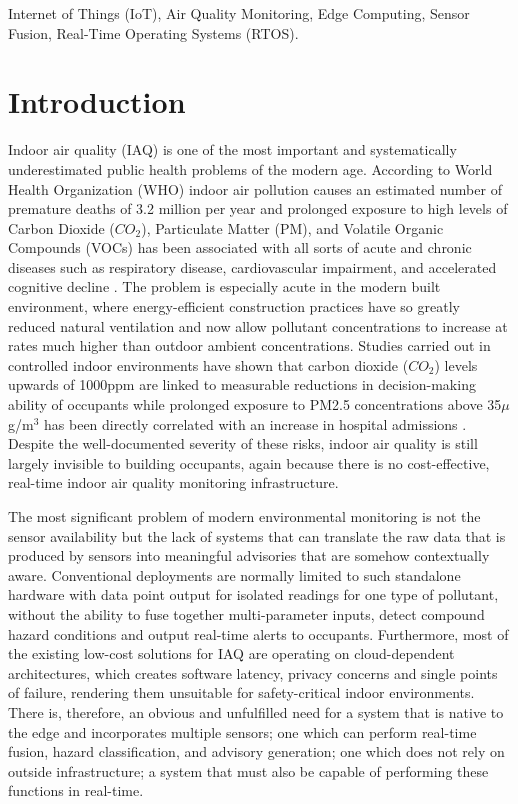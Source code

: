 \documentclass[conference]{IEEEtran}
\begin{document}
\begin{IEEEkeywords}
Internet of Things (IoT), Air Quality Monitoring, Edge Computing, Sensor Fusion, Real-Time Operating Systems (RTOS).
\end{IEEEkeywords}

\section{Introduction}
Indoor air quality (IAQ) is one of the most important and systematically underestimated public health problems of the modern age. According to World Health Organization (WHO) indoor air pollution causes an estimated number of premature deaths of 3.2 million per year and prolonged exposure to high levels of Carbon Dioxide ($CO_2$), Particulate Matter (PM), and Volatile Organic Compounds (VOCs) has been associated with all sorts of acute and chronic diseases such as respiratory disease, cardiovascular impairment, and accelerated cognitive decline \cite{b1}. The problem is especially acute in the modern built environment, where energy-efficient construction practices have so greatly reduced natural ventilation and now allow pollutant concentrations to increase at rates much higher than outdoor ambient concentrations. Studies carried out in controlled indoor environments have shown that carbon dioxide ($CO_2$) levels upwards of 1000ppm are linked to measurable reductions in decision-making ability of occupants while prolonged exposure to PM2.5 concentrations above 35$\mu$g/m$^3$ has been directly correlated with an increase in hospital admissions \cite{b2}. Despite the well-documented severity of these risks, indoor air quality is still largely invisible to building occupants, again because there is no cost-effective, real-time indoor air quality monitoring infrastructure.

The most significant problem of modern environmental monitoring is not the sensor availability but the lack of systems that can translate the raw data that is produced by sensors into meaningful advisories that are somehow contextually aware. Conventional deployments are normally limited to such standalone hardware with data point output for isolated readings for one type of pollutant, without the ability to fuse together multi-parameter inputs, detect compound hazard conditions and output real-time alerts to occupants. Furthermore, most of the existing low-cost solutions for IAQ are operating on cloud-dependent architectures, which creates software latency, privacy concerns and single points of failure, rendering them unsuitable for safety-critical indoor environments. There is, therefore, an obvious and unfulfilled need for a system that is native to the edge and incorporates multiple sensors; one which can perform real-time fusion, hazard classification, and advisory generation; one which does not rely on outside infrastructure; a system that must also be capable of performing these functions in real-time.
\end{document}
